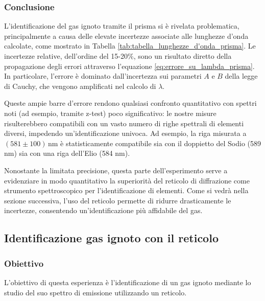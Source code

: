 \documentclass[a4paper]{article}
\begin{document}
\subsubsection{Conclusione}
L'identificazione del gas ignoto tramite il prisma si è rivelata problematica, principalmente a causa delle elevate incertezze associate alle lunghezze d'onda calcolate, come mostrato in Tabella \ref{tab:tabella_lunghezze_d'onda_prisma}. Le incertezze relative, dell'ordine del 15-20\%, sono un risultato diretto della propagazione degli errori attraverso l'equazione \ref{eq:errore_su_lambda_prisma}. In particolare, l'errore è dominato dall'incertezza sui parametri $A$ e $B$ della legge di Cauchy, che vengono amplificati nel calcolo di $\lambda$.

Queste ampie barre d'errore rendono qualsiasi confronto quantitativo con spettri noti (ad esempio, tramite z-test) poco significativo: le nostre misure risulterebbero compatibili con un vasto numero di righe spettrali di elementi diversi, impedendo un'identificazione univoca. Ad esempio, la riga misurata a $(581 \pm 100)\,$nm è statisticamente compatibile sia con il doppietto del Sodio (589 nm) sia con una riga dell'Elio (584 nm).

Nonostante la limitata precisione, questa parte dell'esperimento serve a evidenziare in modo quantitativo la superiorità del reticolo di diffrazione come strumento spettroscopico per l'identificazione di elementi. Come si vedrà nella sezione successiva, l'uso del reticolo permette di ridurre drasticamente le incertezze, consentendo un'identificazione più affidabile del gas.

\subsection{Identificazione gas ignoto con il reticolo}
\subsubsection{Obiettivo}
L'obiettivo di questa esperienza è l'identificazione di un gas ignoto mediante lo studio del suo spettro di emissione utilizzando un reticolo.
\end{document}
